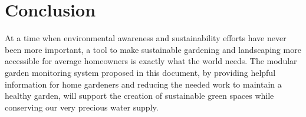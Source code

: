 \documentclass[]{article}
\begin{document}
\section*{Conclusion}

At a time when environmental awareness and sustainability efforts have never been more important, a tool to make sustainable gardening and landscaping more accessible for average homeowners is exactly what the world needs. The modular garden monitoring system proposed in this document, by providing helpful information for home gardeners and reducing the needed work to maintain a healthy garden, will support the creation of sustainable green spaces while conserving our very precious water supply.\newpage
\vspace{0.6cm}


\end{document}
